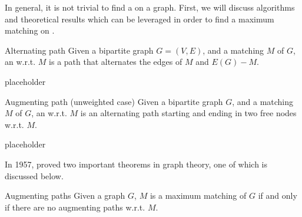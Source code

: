 \documentclass[a4paper, 12pt]{report}
\begin{document}
    In general, it is not trivial to find a  on a graph. First, we will discuss algorithms and theoretical results which can be leveraged in order to find a maximum matching on .

    \begin{frameddefn}{Alternating path}
        Given a bipartite graph $G = (V, E)$, and a matching $M$ of $G$, an  w.r.t. $M$ is a path that alternates the edges of $M$ and $E(G) - M$.
    \end{frameddefn}

    \begin{example}
        placeholder 
    \end{example}

    \begin{frameddefn}[label={aug path}]{Augmenting path (unweighted case)}
        Given a bipartite graph $G$, and a matching $M$ of $G$, an  w.r.t. $M$ is an alternating path starting and ending in two free nodes w.r.t. $M$.
    \end{frameddefn}

    \begin{example}
        placeholder 
    \end{example}

    In 1957, \textcite{berge} proved two important theorems in graph theory, one of which is discussed below.

    \begin{framedthm}[label={aug paths}]{Augmenting paths}
        Given a graph $G$, $M$ is a maximum matching of $G$ if and only if there are no augmenting paths w.r.t. $M$.
    \end{framedthm}
\end{document}
